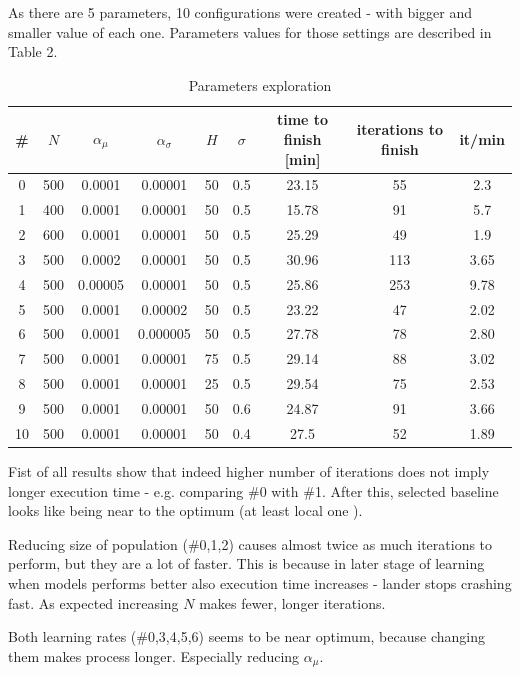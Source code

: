 \documentclass[12pt]{article}
\begin{document}
As there are 5 parameters, 10 configurations were created - with bigger and smaller value of each one. Parameters values for those settings are described in Table 2.

\begin{table}[!!h]
\centering
\begin{tabular}{|c|c|c|c|c|c|c|c|c|}
\hline 
\# & $N$	& $\alpha_\mu$	& $\alpha_\sigma$	& $H$	& $\sigma$ &	time to finish [min]&	iterations to finish & it/min\\
\hline
0 & 500     &  0.0001	& 0.00001	& 50	& 0.5	& 23.15 &	55   & 2.3 \\
1  & 400	&  0.0001	& 0.00001	& 50	& 0.5	& 15.78 &	91   & 5.7\\
2  & 600	&  0.0001	& 0.00001	& 50	& 0.5	& 25.29 &	49   & 1.9\\
3  & 500	&  0.0002	& 0.00001	& 50	& 0.5	& 30.96 &	113  &  3.65\\
4  & 500	&  0.00005	& 0.00001	& 50	& 0.5	& 25.86 &	253  &  9.78\\
5  & 500	&  0.0001	& 0.00002	& 50	& 0.5	& 23.22 &	47   & 2.02\\
6  & 500	&  0.0001	& 0.000005 & 	50 	& 0.5	& 27.78 &	78   & 2.80\\
7  & 500	&  0.0001	& 0.00001	& 75	& 0.5	& 29.14 &	88   & 3.02\\
8  & 500	&  0.0001	& 0.00001	& 25	& 0.5	& 29.54 &	75   & 2.53\\
9  & 500	&  0.0001	& 0.00001	& 50	& 0.6	& 24.87 &	91   & 3.66\\
10 &  500&     0.0001	& 0.00001	& 50	& 0.4	&  27.5 &	52   & 1.89\\
\hline
\end{tabular} 
\caption{Parameters exploration}
\end{table}
Fist of all results show that indeed higher number of iterations does not imply longer execution time - e.g. comparing \#0 with \#1. After this, selected baseline looks like being near to the optimum (at least local one ).

Reducing size of population (\#0,1,2) causes almost twice as much iterations to perform, but they are a lot of faster. This is because in later stage of learning when models performs better also execution time increases - lander stops crashing fast. As expected increasing $N$ makes fewer, longer iterations.

Both learning rates (\#0,3,4,5,6) seems to be near optimum, because changing them makes process longer. Especially reducing $\alpha_\mu$.
\end{document}

